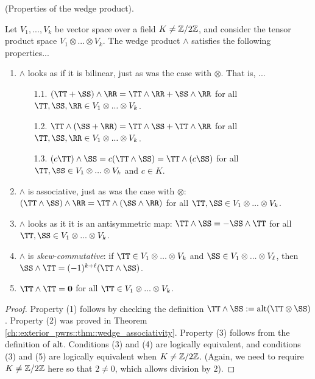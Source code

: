 \begin{theorem}
    (Properties of the wedge product).
    
    Let $V_1, ..., V_k$ be vector space over a field $K \neq \mathbb{Z}/2\mathbb{Z}$, and consider the tensor product space $V_1 \otimes ... \otimes V_k$. The wedge product $\wedge$ satisfies the following properties...
    
    \begin{enumerate}
        \item $\wedge$ looks as if it is bilinear, just as was the case with $\otimes$. That is, ...
        \begin{enumerate}
            \item[1.1.] $(\TT + \SS) \wedge \RR = \TT \wedge \RR + \SS \wedge \RR$ for all $\TT, \SS, \RR \in V_1 \otimes ... \otimes V_k$.
            \item[1.2.] $\TT \wedge (\SS + \RR) = \TT \wedge \SS + \TT \wedge \RR$ for all $\TT, \SS, \RR \in V_1 \otimes ... \otimes V_k$.
            \item[1.3.] $(c\TT) \wedge \SS = c(\TT \wedge \SS) = \TT \wedge (c \SS)$ for all $\TT, \SS \in V_1 \otimes ... \otimes V_k$ and $c \in K$.
        \end{enumerate}
        \item $\wedge$ is associative, just as was the case with $\otimes$: $(\TT \wedge \SS) \wedge \RR = \TT \wedge (\SS \wedge \RR)$ for all $\TT, \SS \in V_1 \otimes ... \otimes V_k$. 
        \item $\wedge$ looks as it it is an antisymmetric map: $\TT \wedge \SS = -\SS \wedge \TT$ for all $\TT, \SS \in V_1 \otimes ... \otimes V_k$.
        \item $\wedge$ is \textit{skew-commutative}: if $\TT \in V_1 \otimes ... \otimes V_k$ and $\SS \in V_1 \otimes ... \otimes V_\ell$, then $\SS \wedge \TT = (-1)^{k + \ell} (\TT \wedge \SS)$.
        \item $\TT \wedge \TT = \mathbf{0}$ for all $\TT \in V_1 \otimes ... \otimes V_k$.
    \end{enumerate}
\end{theorem}

\begin{proof}
   Property (1) follows by checking the definition $\TT \wedge \SS := \alt(\TT \otimes \SS)$. Property (2) was proved in Theorem \ref{ch::exterior_pwrs::thm::wedge_associativity}. Property (3) follows from the definition of $\text{alt}$. Conditions (3) and (4) are logically equivalent, and conditions (3) and (5) are logically equivalent when $K \neq \mathbb{Z}/2\mathbb{Z}$. (Again, we need to require $K \neq \mathbb{Z}/2\mathbb{Z}$ here so that $2 \neq 0$, which allows division by $2$). 
\end{proof}

